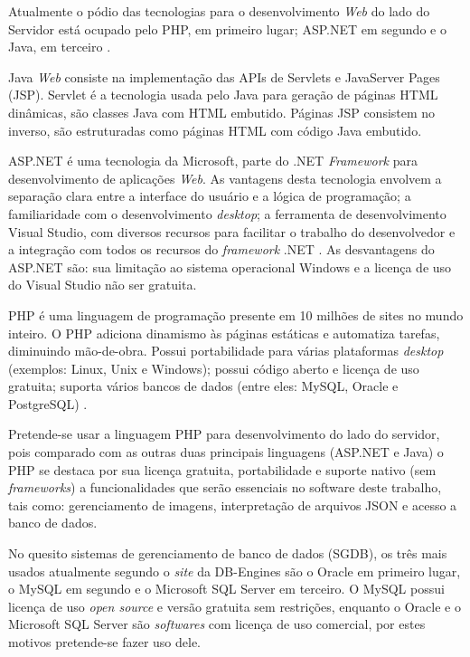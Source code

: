 \begin{description}
Atualmente o pódio das tecnologias para o desenvolvimento \textit{Web} do lado do Servidor está ocupado pelo PHP, em primeiro lugar; ASP.NET em segundo e o Java, em terceiro \cite{w3techs2015}. \par

Java \textit{Web} consiste na implementação das APIs de Servlets e JavaServer Pages (JSP). Servlet é a tecnologia usada pelo Java para geração de páginas HTML dinâmicas, são classes Java com HTML embutido. Páginas JSP consistem no inverso, são estruturadas como páginas HTML com código Java embutido. \par

ASP.NET é uma tecnologia da Microsoft, parte do .NET \textit{Framework} para desenvolvimento de aplicações \textit{Web}. As vantagens desta tecnologia envolvem a separação clara entre a interface do usuário e a lógica de programação; a familiaridade com o desenvolvimento \textit{desktop}; a ferramenta de desenvolvimento Visual Studio, com diversos recursos para facilitar o trabalho do desenvolvedor e a integração com todos os recursos do \textit{framework} .NET \cite{imar2014}. As desvantagens do ASP.NET são: sua limitação ao sistema operacional Windows e a licença de uso do Visual Studio não ser gratuita. \par

PHP é uma linguagem de programação presente em 10 milhões de sites no mundo inteiro. O PHP adiciona dinamismo às páginas estáticas e automatiza tarefas, diminuindo mão-de-obra. Possui portabilidade para várias plataformas \textit{desktop} (exemplos: Linux, Unix e Windows); possui código aberto e licença de uso gratuita; suporta vários bancos de dados (entre eles: MySQL, Oracle e PostgreSQL) \cite{niederauer2004, welling2003}. \par

Pretende-se usar a linguagem PHP para desenvolvimento do lado do servidor, pois comparado com as outras duas principais linguagens (ASP.NET e Java) o PHP se destaca por sua licença gratuita, portabilidade e suporte nativo (sem \textit{frameworks}) a funcionalidades que serão essenciais no software deste trabalho, tais como: gerenciamento de imagens, interpretação de arquivos JSON e acesso a banco de dados. \par

No quesito sistemas de gerenciamento de banco de dados (SGDB), os três mais usados atualmente segundo o \textit{site} da DB-Engines são o Oracle em primeiro lugar, o MySQL em segundo e o Microsoft SQL Server em terceiro. O MySQL possui licença de uso \textit{open source} e versão gratuita sem restrições, enquanto o Oracle e o Microsoft SQL Server são \textit{softwares} com licença de uso comercial, por estes motivos pretende-se fazer uso dele.


\end{description}
